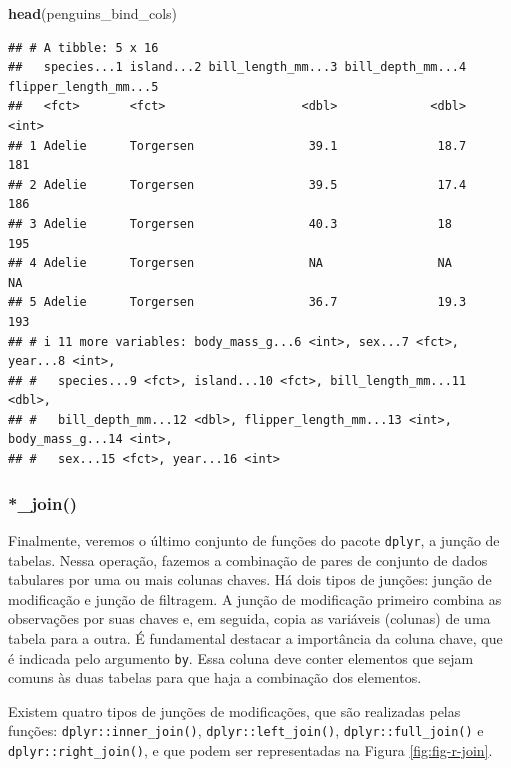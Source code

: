 \documentclass[
]{article}
\newenvironment{Shaded}{\begin{snugshade}}{\end{snugshade}}
\newcommand{\FunctionTok}[1]{\textcolor[rgb]{0.13,0.29,0.53}{\textbf{#1}}}
\newcommand{\NormalTok}[1]{#1}
\begin{document}
\begin{Shaded}
\begin{Highlighting}[]
\FunctionTok{head}\NormalTok{(penguins\_bind\_cols)}
\end{Highlighting}
\end{Shaded}

\begin{verbatim}
## # A tibble: 5 x 16
##   species...1 island...2 bill_length_mm...3 bill_depth_mm...4 flipper_length_mm...5
##   <fct>       <fct>                   <dbl>             <dbl>                 <int>
## 1 Adelie      Torgersen                39.1              18.7                   181
## 2 Adelie      Torgersen                39.5              17.4                   186
## 3 Adelie      Torgersen                40.3              18                     195
## 4 Adelie      Torgersen                NA                NA                      NA
## 5 Adelie      Torgersen                36.7              19.3                   193
## # i 11 more variables: body_mass_g...6 <int>, sex...7 <fct>, year...8 <int>,
## #   species...9 <fct>, island...10 <fct>, bill_length_mm...11 <dbl>,
## #   bill_depth_mm...12 <dbl>, flipper_length_mm...13 <int>, body_mass_g...14 <int>,
## #   sex...15 <fct>, year...16 <int>
\end{verbatim}

\hypertarget{join}{%
\subsubsection{*\_join()}\label{join}}

Finalmente, veremos o último conjunto de funções do pacote \texttt{dplyr}, a junção de tabelas. Nessa operação, fazemos a combinação de pares de conjunto de dados tabulares por uma ou mais colunas chaves. Há dois tipos de junções: junção de modificação e junção de filtragem. A junção de modificação primeiro combina as observações por suas chaves e, em seguida, copia as variáveis (colunas) de uma tabela para a outra. É fundamental destacar a importância da coluna chave, que é indicada pelo argumento \texttt{by}. Essa coluna deve conter elementos que sejam comuns às duas tabelas para que haja a combinação dos elementos.

Existem quatro tipos de junções de modificações, que são realizadas pelas funções: \texttt{dplyr::inner\_join()}, \texttt{dplyr::left\_join()}, \texttt{dplyr::full\_join()} e \texttt{dplyr::right\_join()}, e que podem ser representadas na Figura \ref{fig:fig-r-join}.
\end{document}
